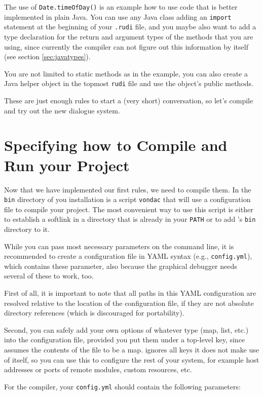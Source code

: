 The use of \texttt{Date.timeOfDay()} is an example how to use code
that is better implemented in plain Java. You can use any Java class
adding an \texttt{import} statement at the beginning of your
\texttt{.rudi} file, and you maybe also want to add a type declaration
for the return and argument types of the methods that you are using,
since currently the compiler can not figure out this information by
itself (see section \ref{sec:javatypes}).

You are not limited to static methods as in the example, you can also
create a Java helper object in the topmost \texttt{rudi} file and use
the object's public methods.

These are just enough rules to start a (very short) conversation, so
let's compile and try out the new dialogue system.

\section{Specifying how to Compile and Run your Project}\label{sec:config}

Now that we have implemented our first rules, we need to compile them. In the
\texttt{bin} directory of you \vonda installation is a script \texttt{vondac}
that will use a configuration file to compile your project. The most convenient
way to use this script is either to establish a softlink in a directory that is
already in your \texttt{PATH} or to add \vonda's \texttt{bin} directory to it.

While you can pass most necessary parameters on the command line, it
is recommended to create a configuration file in YAML syntax (e.g.,
\texttt{config.yml}), which contains these parameter, also because the
graphical debugger needs several of these to work, too.

First of all, it is important to note that all paths in this YAML
configuration are resolved relative to the location of the
configuration file, if they are not absolute directory references
(which is discouraged for portability).

Second, you can safely add your own options of whatever type (map,
list, etc.) into the configuration file, provided you put them under a
top-level key, since \vonda assumes the contents of the file to be a
map. \vonda ignores all keys it does not make use of itself, so you
can use this to configure the rest of your system, for example host
addresses or ports of remote modules, custom resources, etc.

For the \vonda compiler, your \texttt{config.yml} should contain the
following parameters:\\

